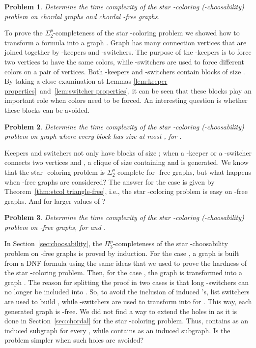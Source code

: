 \documentclass[a4paper, 11pt, oneside]{article}
\newtheorem{openproblem}{Problem}
\newcommand{\stp}{\ensuremath{\Sigma^p_2}\xspace}
\newcommand{\ptp}{\ensuremath{\Pi^p_3}\xspace}
\begin{document}
\begin{openproblem}
 Determine the time complexity of the star -coloring (-choosability) problem on chordal graphs and chordal -free graphs.
\end{openproblem}

To prove the \stp-completeness of the star -coloring problem we showed how to transform a formula  into a graph .  Graph  has many connection vertices that are joined together by -keepers and -switchers.  The purpose of the -keepers is to force two vertices to have the same colors, while -switchers are used to force different colors on a pair of vertices.  Both -keepers and -switchers contain blocks of size .  By taking a close examination at Lemmas \ref{lem:keeper properties}~and~\ref{lem:switcher properties}, it can be seen that these blocks play an important role when colors need to be forced.  An interesting question is whether these blocks can be avoided.  

\begin{openproblem}
 Determine the time complexity of the star -coloring (-choosability) problem on graph where every block has size at most , for .
\end{openproblem}

Keepers and switchers not only have blocks of size ; when a -keeper or a -switcher connects two vertices  and , a clique of size  containing  and  is generated.  We know that the star -coloring problem is \stp-complete for -free graphs, but what happens when -free graphs are considered?  The answer for the case  is given by Theorem~\ref{thm:stcol triangle-free}, i.e., the star -coloring problem is easy on -free graphs.  And for larger values of ?

\begin{openproblem}
 Determine the time complexity of the star -coloring (-choosability) problem on -free graphs, for  and .
\end{openproblem}

In Section~\ref{sec:choosability}, the \ptp-completeness of the star -choosability problem on -free graphs is proved by induction.  For the case , a graph  is built from a DNF formula using the same ideas that we used to prove the hardness of the star -coloring problem.  Then, for the case , the graph  is transformed into a graph .  The reason for splitting the proof in two cases is that long -switchers can no longer be included into .  So, to avoid the inclusion of induced 's, list switchers are used to build , while -switchers are used to transform  into  for .  This way, each generated graph  is -free.  We did not find a way to extend the holes in  as it is done in Section~\ref{sec:chordal} for the star -coloring problem.  Thus,  contains  as an induced subgraph for every , while  contains  as an induced subgraph.  Is the problem simpler when such holes are avoided?
\end{document}
